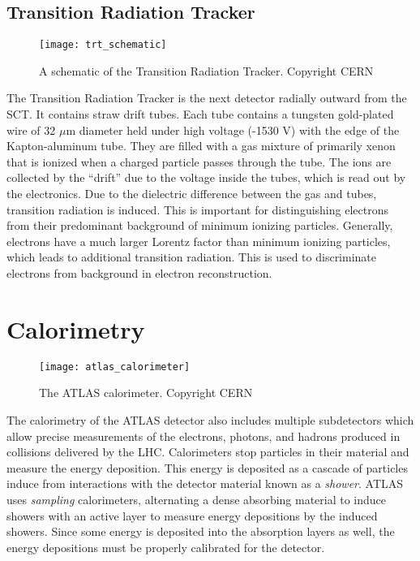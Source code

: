 \subsection{Transition Radiation Tracker}
\begin{figure}[tbp]
\caption{A schematic of the Transition Radiation Tracker. Copyright CERN} \label{fig:trt_schematic}
\texttt{[image: trt\_schematic]}
\end{figure}
The Transition Radiation Tracker is the next detector radially outward from the SCT.
It contains straw drift tubes.
Each tube contains a tungsten gold-plated wire of 32 $\mu$m diameter held under high voltage (-1530 V) with the edge of the Kapton-aluminum tube.
They are filled with a gas mixture of primarily xenon that is ionized when a charged particle passes through the tube.
The ions are collected by the ``drift'' due to the voltage inside the tubes, which is read out by the electronics.
Due to the dielectric difference between the gas and tubes, transition radiation is induced.
This is important for distinguishing electrons from their predominant background of minimum ionizing particles.
Generally, electrons have a much larger Lorentz factor than minimum ionizing particles, which leads to additional transition radiation.
This is used to discriminate electrons from background in electron reconstruction.

\section{Calorimetry}
\begin{figure}[tbp]
\caption{The ATLAS calorimeter. Copyright CERN} \label{fig:atlas_calorimeter}
\texttt{[image: atlas\_calorimeter]}
\end{figure}

The calorimetry of the ATLAS detector also includes multiple subdetectors which allow precise measurements of the electrons, photons, and hadrons produced in collisions delivered by the LHC.
Calorimeters stop particles in their material and measure the energy deposition.
This energy is deposited as a cascade of particles induce from interactions with the detector material known as a \textit{shower}.
ATLAS uses \textit{sampling} calorimeters, alternating a dense absorbing material to induce showers with an active layer to measure energy depositions by the induced showers.
Since some energy is deposited into the absorption layers as well, the energy depositions must be properly calibrated for the detector.

